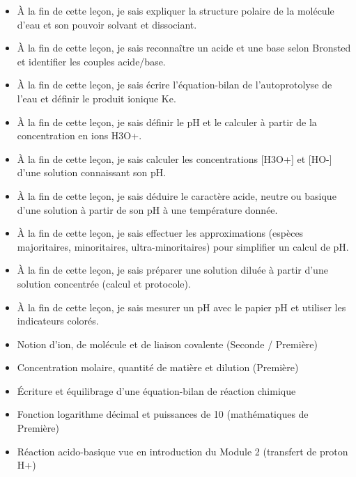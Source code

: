 \documentclass[11pt]{article}
\begin{document}
\begin{objectifs}
\begin{itemize}
\item À la fin de cette leçon, je sais expliquer la structure polaire de la molécule d'eau et son pouvoir solvant et dissociant.
\item À la fin de cette leçon, je sais reconnaître un acide et une base selon Bronsted et identifier les couples acide/base.
\item À la fin de cette leçon, je sais écrire l'équation-bilan de l'autoprotolyse de l'eau et définir le produit ionique Ke.
\item À la fin de cette leçon, je sais définir le pH et le calculer à partir de la concentration en ions H3O+.
\item À la fin de cette leçon, je sais calculer les concentrations [H3O+] et [HO-] d'une solution connaissant son pH.
\item À la fin de cette leçon, je sais déduire le caractère acide, neutre ou basique d'une solution à partir de son pH à une température donnée.
\item À la fin de cette leçon, je sais effectuer les approximations (espèces majoritaires, minoritaires, ultra-minoritaires) pour simplifier un calcul de pH.
\item À la fin de cette leçon, je sais préparer une solution diluée à partir d'une solution concentrée (calcul et protocole).
\item À la fin de cette leçon, je sais mesurer un pH avec le papier pH et utiliser les indicateurs colorés.
\end{itemize}
\end{objectifs}

\begin{prerequis}
\begin{itemize}
\item Notion d'ion, de molécule et de liaison covalente (Seconde / Première)
\item Concentration molaire, quantité de matière et dilution (Première)
\item Écriture et équilibrage d'une équation-bilan de réaction chimique
\item Fonction logarithme décimal et puissances de 10 (mathématiques de Première)
\item Réaction acido-basique vue en introduction du Module 2 (transfert de proton H+)
\end{itemize}
\end{prerequis}
\end{document}
